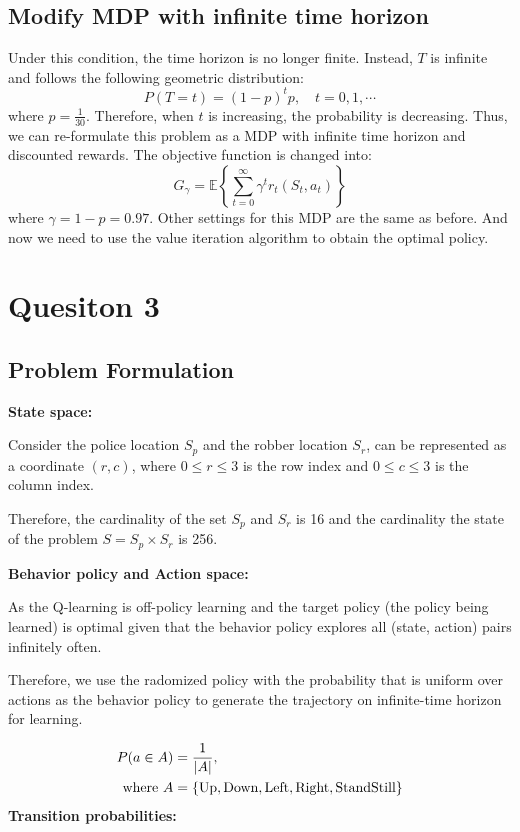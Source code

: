 \documentclass{article}
\begin{document}
\subsection{Modify MDP with infinite time horizon}
Under this condition, the time horizon is no longer finite. Instead, $T$ is infinite and follows the following geometric distribution:
$$P(T=t)=(1-p)^tp, \quad t=0,1,\cdots$$
where $p=\frac{1}{30}$. Therefore, when $t$ is increasing, the probability is decreasing.
Thus, we can re-formulate this problem as a MDP with infinite time horizon and discounted rewards. The objective function is changed into:
$$G_{\gamma}=\mathbb{E}\left\{\sum_{t=0}^{\infty}\gamma^t r_t(S_t,a_t)\right\}$$
where $\gamma=1-p=0.97$.
Other settings for this MDP are the same as before. And now we need to use the value iteration algorithm to obtain the optimal policy.


\section{Quesiton 3}
\subsection{Problem Formulation}

\textbf{State space:}

Consider the police location $S_p$ and the robber location $S_r$, can be represented
as a coordinate $(r, c)$, where $0 \leq r \leq 3$ is the row index and $0 \leq c \leq 3$
is the column index.

Therefore, the cardinality of the set $S_p$ and $S_r$ is 16 and
the cardinality the state of the problem $S = S_p \times S_r$ is 256.

\vspace{0.3cm}

\textbf{Behavior policy and Action space:}

As the Q-learning is off-policy learning and the target policy (the policy being
learned) is optimal given that the behavior policy explores all (state, action) pairs
infinitely often.

Therefore, we use the radomized policy with the probability that is uniform
over actions as the behavior policy to generate the trajectory on infinite-time
horizon for learning.

\begin{align*}
  P(a \in A) &= \frac{1}{|A|}, \\
  \text{where} ~
  A &= \{\textup{Up},\textup{Down},\textup{Left},\textup{Right},\textup{StandStill}\}
\end{align*}
\textbf{Transition probabilities:}
\end{document}
